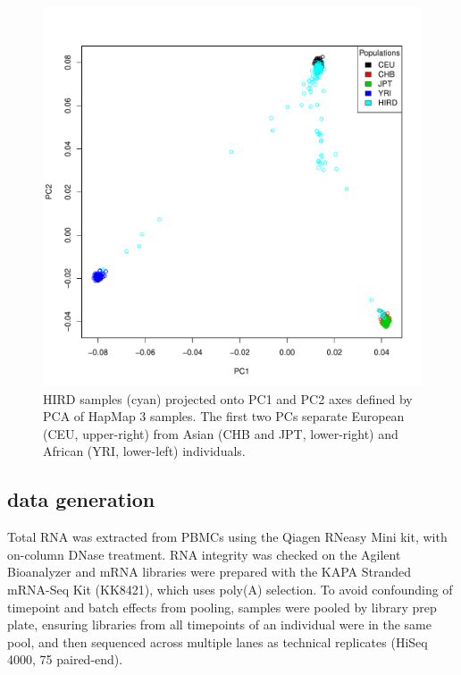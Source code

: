 \begin{figure}
    \includegraphics[width=1.0\textwidth]{mainmatter/figures/chapter_02/coreex_eQTLflu_20171204.gencall.smajor.impute_sex.qc3.pruned.hapmap_merged.flipped.pca.evec.pdf}
    \caption{\gls{HIRD} samples (cyan) projected onto \gls{PC}1 and \gls{PC}2 axes defined by \gls{PCA} of HapMap 3 samples. The first two \glspl{PC} separate European (CEU, upper-right) from Asian (CHB and JPT, lower-right) and African (YRI, lower-left) individuals.}
    \label{fig:hird_genotype_pca_withHapmap}
\end{figure}

\subsection{ data generation}

Total RNA was extracted from \glspl{PBMC} using the Qiagen RNeasy Mini kit, with on-column DNase treatment.
RNA integrity was checked on the Agilent Bioanalyzer and mRNA libraries were prepared with the KAPA Stranded mRNA-Seq Kit (KK8421), which uses poly(A) selection.
To avoid confounding of timepoint and batch effects from pooling, samples were pooled by library prep plate, ensuring libraries from all timepoints of an individual were in the same pool, and then sequenced across multiple lanes as technical replicates (HiSeq 4000, \SI{75}{\bp} paired-end).

